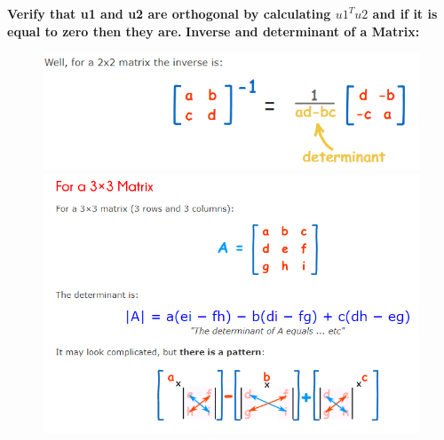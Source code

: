 \textbf{Verify that u1 and u2 are orthogonal by calculating $u1^T u2$ and if it is equal to zero then they are.}
\textbf{Inverse and determinant of a Matrix:}
\begin{figure}[H]
    \centering
    \begin{minipage}{0.4\textwidth}
        \includegraphics[width=\textwidth]{Figures/inv.png} %
    \end{minipage}\hfill
    \begin{minipage}{0.6\textwidth}
        \includegraphics[width=1.1\textwidth]{Figures/det.png} %
    \end{minipage}
\end{figure}